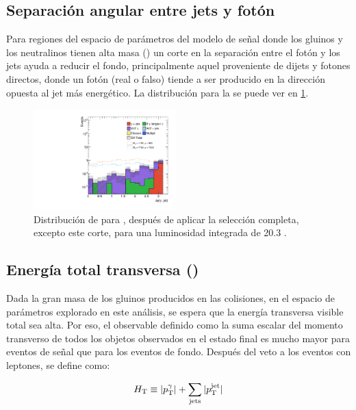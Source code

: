 \subsection{Separación angular entre jets y fotón}

Para regiones del espacio de parámetros del modelo de señal
donde los gluinos y los neutralinos tienen alta masa ({\SRH})
un corte en la separación entre el fotón y los jets ayuda a
reducir el fondo, principalmente aquel proveniente de dijets y
fotones directos, donde un fotón (real o falso) tiende a ser
producido en la dirección opuesta al jet más energético.
La distribución para la {\SRH} se puede ver en \cref{fig:opt_dphi_gamjet}.


\begin{figure}[!h]
  \centering

  \includegraphics[width=0.49\textwidth]{figures/dphi_gamjet_srh}

  \caption{Distribución de {\dphijg} para {\SRH}, después de aplicar la selección completa, excepto este corte,
    para una luminosidad integrada de 20.3 \ifb.}
  \label{fig:opt_dphi_gamjet}
\end{figure}



\subsection{Energía total transversa (\HT)}
\label{sec:ht_obj}

Dada la gran masa de los gluinos producidos en las colisiones, en el espacio de
parámetros explorado en este análisis, se espera que la energía transversa
visible total sea alta. Por eso, el observable {\HT} definido como la suma
escalar del momento transverso de todos los objetos observados en el estado
final es mucho mayor para eventos de señal que para los eventos de fondo.
Después del veto a los eventos con leptones, {\HT} se define como:

\begin{equation}
  H_{\mathrm{T}} \equiv |p_{\mathrm{T}}^{\gamma}| + \sum_{\mathrm{jets}} |p_{\mathrm{T}}^\mathrm{jet}|
  \label{eq:ht_def}
\end{equation}

